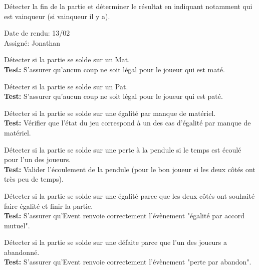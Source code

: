 \documentclass{article}
\begin{document}
\begin{needbox}
    Détecter la fin de la partie et déterminer le résultat en indiquant notamment qui est vainqueur (si vainqueur il y a).
    \begin{duedatebox}
        Date de rendu: 13/02\\
        Assigné: Jonathan
    \end{duedatebox}
    \begin{subneedbox}[F38.1: Mat]
        Détecter si la partie se solde sur un Mat.\\
        \textbf{Test:} S'assurer qu'aucun coup ne soit légal pour le joueur qui est maté.
    \end{subneedbox}
    \begin{subneedbox}[F38.2: Pat]
        Détecter si la partie se solde sur un Pat.\\
        \textbf{Test:} S'assurer qu'aucun coup ne soit légal pour le joueur qui est paté.
    \end{subneedbox}
    \begin{subneedbox}
        Détecter si la partie se solde sur une égalité par manque de matériel.\\
        \textbf{Test:} Vérifier que l'état du jeu correspond à un des cas d'égalité par manque de matériel. 
    \end{subneedbox}
    \begin{subneedbox}
        Détecter si la partie se solde sur une perte à la pendule si le temps est écoulé pour l'un des joueurs.\\
        \textbf{Test:} Valider l'écoulement de la pendule (pour le bon joueur si les deux côtés ont très peu de temps).
    \end{subneedbox}
    \begin{subneedbox}
        Détecter si la partie se solde sur une égalité parce que les deux côtés ont souhaité faire égalité et finir la partie.\\
        \textbf{Test:} S'assurer qu'Event renvoie correctement l'évènement "égalité par accord mutuel".
    \end{subneedbox}
    \begin{subneedbox}
        Détecter si la partie se solde sur une défaite parce que l'un des joueurs a abandonné.\\
        \textbf{Test:} S'assurer qu'Event renvoie correctement l'évènement "perte par abandon".

\end{subneedbox}
\end{needbox}
\end{document}
